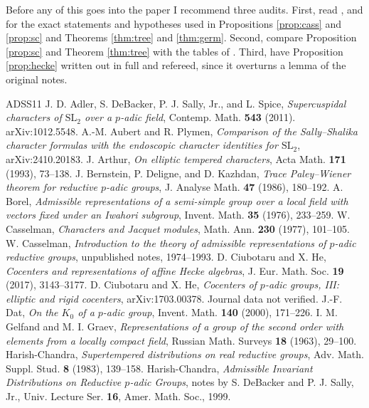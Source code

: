 \documentclass[12pt,letterpaper]{amsart}
\numberwithin{equation}{section}
\theoremstyle{definition}
\theoremstyle{remark}
\begin{document}
Before any of this goes into the paper I recommend three audits. First, read \cite{Ca77}, \cite[Section III.4]{SS97} and \cite{HC99} for the exact statements and hypotheses used in Propositions \ref{prop:cass} and \ref{prop:sc} and Theorems \ref{thm:tree} and \ref{thm:germ}. Second, compare Proposition \ref{prop:sc} and Theorem \ref{thm:tree} with the tables of \cite{SS68,ADSS11}. Third, have Proposition \ref{prop:hecke} written out in full and refereed, since it overturns a lemma of the original notes.

\begin{thebibliography}{ADSS11}
 J. D. Adler, S. DeBacker, P. J. Sally, Jr., and L. Spice, \emph{Supercuspidal characters of $\mathrm{SL}_2$ over a $p$-adic field}, Contemp. Math. \textbf{543} (2011). arXiv:1012.5548.
 A.-M. Aubert and R. Plymen, \emph{Comparison of the Sally--Shalika character formulas with the endoscopic character identities for $\mathrm{SL}_2$}, arXiv:2410.20183.
 J. Arthur, \emph{On elliptic tempered characters}, Acta Math. \textbf{171} (1993), 73--138.
 J. Bernstein, P. Deligne, and D. Kazhdan, \emph{Trace Paley--Wiener theorem for reductive $p$-adic groups}, J. Analyse Math. \textbf{47} (1986), 180--192.
 A. Borel, \emph{Admissible representations of a semi-simple group over a local field with vectors fixed under an Iwahori subgroup}, Invent. Math. \textbf{35} (1976), 233--259.
 W. Casselman, \emph{Characters and Jacquet modules}, Math. Ann. \textbf{230} (1977), 101--105.
 W. Casselman, \emph{Introduction to the theory of admissible representations of $p$-adic reductive groups}, unpublished notes, 1974--1993.
 D. Ciubotaru and X. He, \emph{Cocenters and representations of affine Hecke algebras}, J. Eur. Math. Soc. \textbf{19} (2017), 3143--3177.
 D. Ciubotaru and X. He, \emph{Cocenters of $p$-adic groups, III: elliptic and rigid cocenters}, arXiv:1703.00378. Journal data not verified.
 J.-F. Dat, \emph{On the $K_0$ of a $p$-adic group}, Invent. Math. \textbf{140} (2000), 171--226.
 I. M. Gelfand and M. I. Graev, \emph{Representations of a group of the second order with elements from a locally compact field}, Russian Math. Surveys \textbf{18} (1963), 29--100.
 Harish-Chandra, \emph{Supertempered distributions on real reductive groups}, Adv. Math. Suppl. Stud. \textbf{8} (1983), 139--158.
 Harish-Chandra, \emph{Admissible Invariant Distributions on Reductive $p$-adic Groups}, notes by S. DeBacker and P. J. Sally, Jr., Univ. Lecture Ser. \textbf{16}, Amer. Math. Soc., 1999.

\end{thebibliography}
\end{document}
